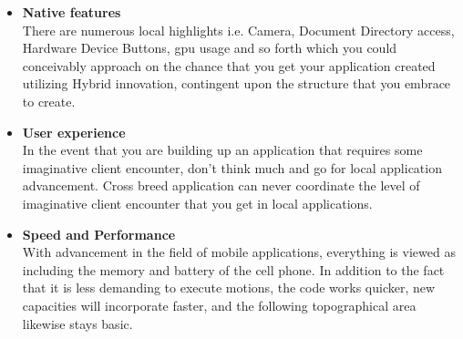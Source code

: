 \begin{itemize}
  \item \textbf{Native features} \\ 
  There are numerous local highlights i.e. Camera, Document Directory access, Hardware Device Buttons, \gls{gpu} usage and so forth which you could conceivably approach on the chance that you get your application created utilizing Hybrid innovation, contingent upon the structure that you embrace to create.
  
  \item \textbf{User experience} \\ 
  In the event that you are building up an application that requires some imaginative client encounter, don't think much and go for local application advancement. Cross breed application can never coordinate the level of imaginative client encounter that you get in local applications.
  
  \item \textbf{Speed and Performance} \\
 With advancement in the field of mobile applications, everything is viewed as including the memory and battery of the cell phone. In addition to the fact that it is less demanding to execute motions, the code works quicker, new capacities will incorporate faster, and the following topographical area likewise stays basic.
 
\end{itemize}
